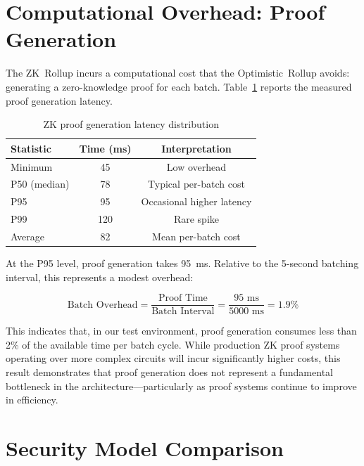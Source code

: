 \documentclass[
]{elteikthesis}[2024/04/26]
\begin{document}
\section{Computational Overhead: Proof Generation}

The ZK~Rollup incurs a computational cost that the Optimistic~Rollup avoids: generating a zero-knowledge proof for each batch. Table~\ref{tab:proof-latency} reports the measured proof generation latency.

\begin{table}[h]
    \centering
    \begin{tabular}{l|c|c}
        \hline
        \textbf{Statistic} & \textbf{Time (ms)} & \textbf{Interpretation} \\
        \hline
        Minimum & 45 & Low overhead \\
        \hline
        P50 (median) & 78 & Typical per-batch cost \\
        \hline
        P95 & 95 & Occasional higher latency \\
        \hline
        P99 & 120 & Rare spike \\
        \hline
        Average & 82 & Mean per-batch cost \\
        \hline
    \end{tabular}
    \caption{ZK proof generation latency distribution}
    \label{tab:proof-latency}
\end{table}

At the P95 level, proof generation takes 95~ms. Relative to the 5-second batching interval, this represents a modest overhead:

\begin{equation}
\text{Batch Overhead} = \frac{\text{Proof Time}}{\text{Batch Interval}} = \frac{95 \text{ ms}}{5000 \text{ ms}} = 1.9\%
\end{equation}

This indicates that, in our test environment, proof generation consumes less than 2\% of the available time per batch cycle. While production ZK proof systems operating over more complex circuits will incur significantly higher costs, this result demonstrates that proof generation does not represent a fundamental bottleneck in the architecture---particularly as proof systems continue to improve in efficiency.

\section{Security Model Comparison}
\end{document}
